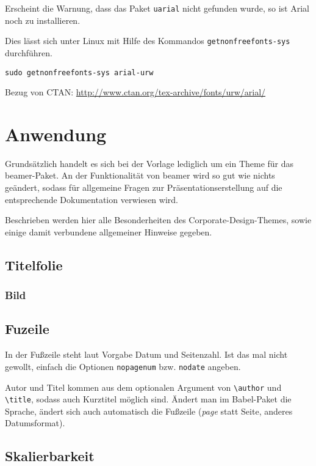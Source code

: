\documentclass[a4paper,colorscheme=green,TUBStitlepage=picture]{tubsreprt}
\begin{document}
Erscheint die Warnung, dass das Paket \lstinline{uarial} nicht gefunden wurde,
so ist Arial noch zu installieren.

Dies lässt sich unter Linux mit Hilfe des Kommandos
\lstinline{getnonfreefonts-sys} durchführen.

\begin{lstlisting}
sudo getnonfreefonts-sys arial-urw
\end{lstlisting}

Bezug von CTAN: \url{http://www.ctan.org/tex-archive/fonts/urw/arial/}

\chapter{Anwendung}

Grundsätzlich handelt es sich bei der Vorlage lediglich um ein Theme für
das beamer-Paket. An der Funktionalität von beamer wird so gut wie nichts
geändert, sodass für allgemeine Fragen zur Präsentationserstellung auf die
entsprechende Dokumentation verwiesen wird. %

Beschrieben werden hier alle Besonderheiten des Corporate-Design-Themes, sowie
einige damit verbundene allgemeiner Hinweise gegeben.



\section{Titelfolie}

\subsection{Bild}



\section{Fuzeile}

In der Fußzeile steht laut Vorgabe Datum und Seitenzahl.
Ist das mal nicht gewollt, einfach die Optionen \lstinline{nopagenum} bzw.
\lstinline{nodate} angeben.

Autor und Titel kommen aus dem optionalen Argument von \lstinline{\author}
und \lstinline{\title}, sodass auch Kurztitel möglich sind.
Ändert man im Babel-Paket die Sprache, ändert sich auch automatisch
die Fußzeile (\textit{page} statt Seite, anderes Datumsformat).


\section{Skalierbarkeit}
\end{document}
